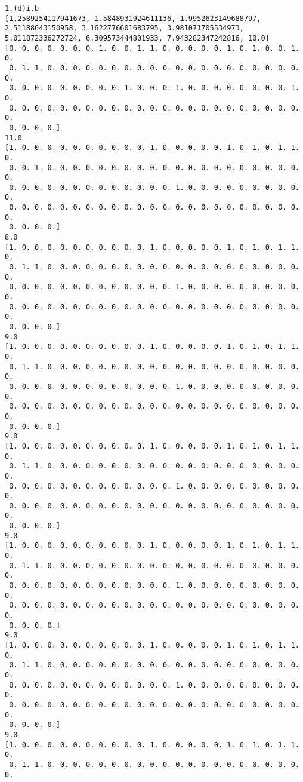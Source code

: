 \documentclass[11pt]{article}
\begin{document}
    \begin{Verbatim}[commandchars=\\\{\}]
1.(d)i.b
[1.2589254117941673, 1.5848931924611136, 1.9952623149688797, 2.51188643150958, 3.1622776601683795, 3.981071705534973, 5.011872336272724, 6.309573444801933, 7.943282347242816, 10.0]
[0. 0. 0. 0. 0. 0. 0. 1. 0. 0. 1. 1. 0. 0. 0. 0. 0. 1. 0. 1. 0. 0. 1. 0.
 0. 1. 1. 0. 0. 0. 0. 0. 0. 0. 0. 0. 0. 0. 0. 0. 0. 0. 0. 0. 0. 0. 0. 0.
 0. 0. 0. 0. 0. 0. 0. 0. 0. 1. 0. 0. 0. 1. 0. 0. 0. 0. 0. 0. 0. 0. 1. 0.
 0. 0. 0. 0. 0. 0. 0. 0. 0. 0. 0. 0. 0. 0. 0. 0. 0. 0. 0. 0. 0. 0. 0. 0.
 0. 0. 0. 0.]
11.0
[1. 0. 0. 0. 0. 0. 0. 0. 0. 0. 0. 1. 0. 0. 0. 0. 0. 1. 0. 1. 0. 1. 1. 0.
 0. 0. 1. 0. 0. 0. 0. 0. 0. 0. 0. 0. 0. 0. 0. 0. 0. 0. 0. 0. 0. 0. 0. 0.
 0. 0. 0. 0. 0. 0. 0. 0. 0. 0. 0. 0. 0. 1. 0. 0. 0. 0. 0. 0. 0. 0. 0. 0.
 0. 0. 0. 0. 0. 0. 0. 0. 0. 0. 0. 0. 0. 0. 0. 0. 0. 0. 0. 0. 0. 0. 0. 0.
 0. 0. 0. 0.]
8.0
[1. 0. 0. 0. 0. 0. 0. 0. 0. 0. 0. 1. 0. 0. 0. 0. 0. 1. 0. 1. 0. 1. 1. 0.
 0. 1. 1. 0. 0. 0. 0. 0. 0. 0. 0. 0. 0. 0. 0. 0. 0. 0. 0. 0. 0. 0. 0. 0.
 0. 0. 0. 0. 0. 0. 0. 0. 0. 0. 0. 0. 0. 1. 0. 0. 0. 0. 0. 0. 0. 0. 0. 0.
 0. 0. 0. 0. 0. 0. 0. 0. 0. 0. 0. 0. 0. 0. 0. 0. 0. 0. 0. 0. 0. 0. 0. 0.
 0. 0. 0. 0.]
9.0
[1. 0. 0. 0. 0. 0. 0. 0. 0. 0. 0. 1. 0. 0. 0. 0. 0. 1. 0. 1. 0. 1. 1. 0.
 0. 1. 1. 0. 0. 0. 0. 0. 0. 0. 0. 0. 0. 0. 0. 0. 0. 0. 0. 0. 0. 0. 0. 0.
 0. 0. 0. 0. 0. 0. 0. 0. 0. 0. 0. 0. 0. 1. 0. 0. 0. 0. 0. 0. 0. 0. 0. 0.
 0. 0. 0. 0. 0. 0. 0. 0. 0. 0. 0. 0. 0. 0. 0. 0. 0. 0. 0. 0. 0. 0. 0. 0.
 0. 0. 0. 0.]
9.0
[1. 0. 0. 0. 0. 0. 0. 0. 0. 0. 0. 1. 0. 0. 0. 0. 0. 1. 0. 1. 0. 1. 1. 0.
 0. 1. 1. 0. 0. 0. 0. 0. 0. 0. 0. 0. 0. 0. 0. 0. 0. 0. 0. 0. 0. 0. 0. 0.
 0. 0. 0. 0. 0. 0. 0. 0. 0. 0. 0. 0. 0. 1. 0. 0. 0. 0. 0. 0. 0. 0. 0. 0.
 0. 0. 0. 0. 0. 0. 0. 0. 0. 0. 0. 0. 0. 0. 0. 0. 0. 0. 0. 0. 0. 0. 0. 0.
 0. 0. 0. 0.]
9.0
[1. 0. 0. 0. 0. 0. 0. 0. 0. 0. 0. 1. 0. 0. 0. 0. 0. 1. 0. 1. 0. 1. 1. 0.
 0. 1. 1. 0. 0. 0. 0. 0. 0. 0. 0. 0. 0. 0. 0. 0. 0. 0. 0. 0. 0. 0. 0. 0.
 0. 0. 0. 0. 0. 0. 0. 0. 0. 0. 0. 0. 0. 1. 0. 0. 0. 0. 0. 0. 0. 0. 0. 0.
 0. 0. 0. 0. 0. 0. 0. 0. 0. 0. 0. 0. 0. 0. 0. 0. 0. 0. 0. 0. 0. 0. 0. 0.
 0. 0. 0. 0.]
9.0
[1. 0. 0. 0. 0. 0. 0. 0. 0. 0. 0. 1. 0. 0. 0. 0. 0. 1. 0. 1. 0. 1. 1. 0.
 0. 1. 1. 0. 0. 0. 0. 0. 0. 0. 0. 0. 0. 0. 0. 0. 0. 0. 0. 0. 0. 0. 0. 0.
 0. 0. 0. 0. 0. 0. 0. 0. 0. 0. 0. 0. 0. 1. 0. 0. 0. 0. 0. 0. 0. 0. 0. 0.
 0. 0. 0. 0. 0. 0. 0. 0. 0. 0. 0. 0. 0. 0. 0. 0. 0. 0. 0. 0. 0. 0. 0. 0.
 0. 0. 0. 0.]
9.0
[1. 0. 0. 0. 0. 0. 0. 0. 0. 0. 0. 1. 0. 0. 0. 0. 0. 1. 0. 1. 0. 1. 1. 0.
 0. 1. 1. 0. 0. 0. 0. 0. 0. 0. 0. 0. 0. 0. 0. 0. 0. 0. 0. 0. 0. 0. 0. 0.

\end{Verbatim}
\end{document}
